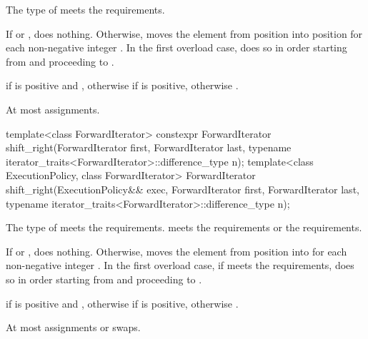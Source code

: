 \begin{itemdescr}
\pnum
\expects
The type of  meets
the  requirements.

\pnum
\effects
If  or , does nothing.
Otherwise, moves the element
from position 
into position 
for each non-negative integer .
In the first overload case, does so in order starting
from  and proceeding to .

\pnum
\returns
{}
if  is positive and ,
otherwise  if  is positive, otherwise .

\pnum
\complexity
At most  assignments.
\end{itemdescr}

%
\begin{itemdecl}
template<class ForwardIterator>
  constexpr ForwardIterator
    shift_right(ForwardIterator first, ForwardIterator last,
                typename iterator_traits<ForwardIterator>::difference_type n);
template<class ExecutionPolicy, class ForwardIterator>
  ForwardIterator
    shift_right(ExecutionPolicy&& exec, ForwardIterator first, ForwardIterator last,
                typename iterator_traits<ForwardIterator>::difference_type n);
\end{itemdecl}

\begin{itemdescr}
\pnum
\expects
The type of  meets
the  requirements.
 meets
the  requirements or
the  requirements.

\pnum
\effects
If  or , does nothing.
Otherwise, moves the element
from position  into 
for each non-negative integer .
In the first overload case, if  meets
the  requirements,
does so in order starting
from  and proceeding to .

\pnum
\returns
{}
if  is positive and ,
otherwise  if  is positive, otherwise .

\pnum
\complexity
At most  assignments or swaps.
\end{itemdescr}

